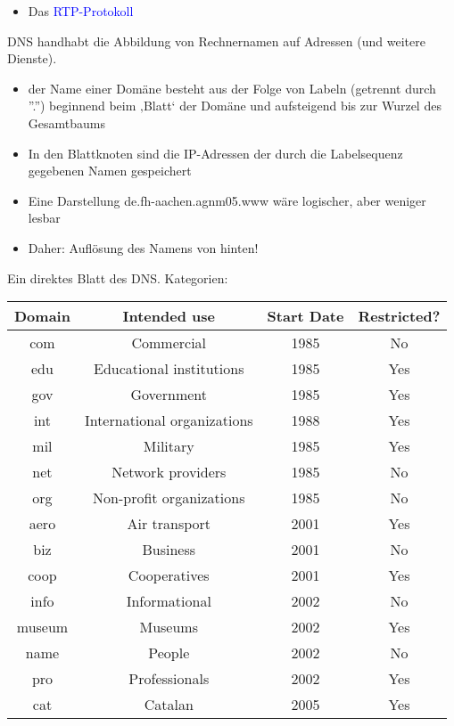 \begin{itemize}
    \item Das \textcolor{blue}{RTP-Protokoll}
\end{itemize}

DNS handhabt die Abbildung von Rechnernamen auf Adressen (und weitere Dienste).

\begin{itemize}
    \item der Name einer Domäne besteht aus der Folge von Labeln (getrennt durch ''.'') beginnend beim ‚Blatt‘ der Domäne und aufsteigend bis zur Wurzel des Gesamtbaums
    \item In den Blattknoten sind die IP-Adressen der durch die Labelsequenz gegebenen Namen gespeichert
    \item Eine Darstellung de.fh-aachen.agnm05.www wäre logischer, aber weniger lesbar
    \item Daher: Auflösung des Namens von hinten!
\end{itemize}

Ein direktes Blatt des DNS. Kategorien:
\begin{center}
    \begin{tabular}{|c|c|c|c|}
        \hline
        Domain & Intended use & Start Date & Restricted? \tabularnewline
        \hline
        com & Commercial & 1985 & No \tabularnewline
        \hline
        edu & Educational institutions & 1985 & Yes \tabularnewline
        \hline
        gov & Government & 1985 & Yes \tabularnewline
        \hline
        int & International organizations & 1988 & Yes \tabularnewline
        \hline
        mil & Military & 1985 & Yes \tabularnewline
        \hline
        net & Network providers & 1985 & No \tabularnewline
        \hline
        org & Non-profit organizations & 1985 & No \tabularnewline
        \hline
        aero & Air transport & 2001 & Yes \tabularnewline
        \hline
        biz & Business & 2001 & No \tabularnewline
        \hline
        coop & Cooperatives & 2001 & Yes \tabularnewline
        \hline
        info & Informational & 2002 & No \tabularnewline
        \hline
        museum & Museums & 2002 & Yes \tabularnewline
        \hline
        name & People & 2002 & No \tabularnewline
        \hline
        pro & Professionals & 2002 & Yes \tabularnewline
        \hline
        cat & Catalan & 2005 & Yes \tabularnewline
        \hline
    \end{tabular}

\end{center}

